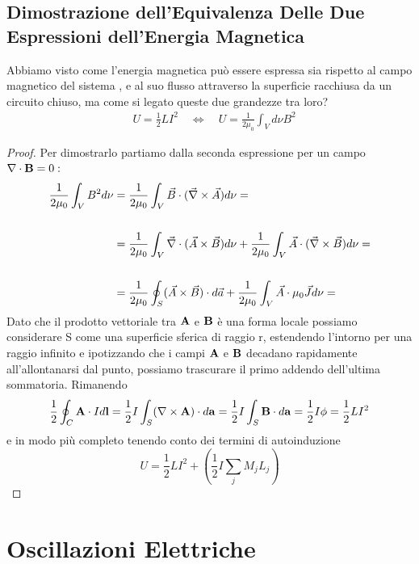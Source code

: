 \subsection{Dimostrazione dell'Equivalenza Delle Due Espressioni dell'Energia Magnetica}

Abbiamo visto come l'energia magnetica pu\`o essere espressa sia rispetto al campo magnetico del sistema , e al suo flusso attraverso la superficie racchiusa da un circuito chiuso, ma come si legato queste due grandezze tra loro? 
\begin{align*}
	& U = \frac{1}{2}L I^2 \quad \iff  \quad U = \frac{1}{2 \mu_0 } \int_{V} d \nu B^2 
\end{align*}

\begin{proof}
	Per dimostrarlo partiamo dalla seconda espressione per un campo $\nabla \cdot \bold{B} = 0:$
\begin{align*}
	\frac{1}{2 \mu_0} \int_V B^2 d \nu & =\frac{1}{2 \mu_0} \int_V \vec{B} \cdot(\vec{\nabla} \times \vec{A}) d \nu= \\ \rule{0pt}{30pt}
	& =\frac{1}{2 \mu_0} \int_V \vec{\nabla} \cdot(\vec{A} \times \vec{B}) d \nu+\frac{1}{2 \mu_0} \int_V \vec{A} \cdot (\vec{\nabla} \times \vec{B}) d \nu = \\ \rule{0pt}{30pt}
	& = \frac{1}{2 \mu_0} \oint_S(\vec{A} \times \vec{B}) \cdot d \vec{a}+\frac{1}{2 \mu_0} \int_V \vec{A} \cdot \mu_0 \vec{J} d \nu=
\end{align*}
Dato che il prodotto vettoriale tra $\bold{A}$ e $\bold{B}$ \`e una forma locale possiamo considerare S come una superficie sferica di raggio r, estendendo l'intorno per una raggio infinito e ipotizzando che i campi $\bold{A}$ e $\bold{B}$ decadano rapidamente all'allontanarsi dal punto, possiamo trascurare il primo addendo dell'ultima sommatoria. Rimanendo 
\begin{equation*}
	\frac{1}{2} \oint_{C} \bold{A} \cdot I d\bold{l} = \frac{1}{2}I \int_{S} (\nabla \times \bold{A})\cdot d\bold{a} = \frac{1}{2}I \int_{S} \bold{B} \cdot d\bold{a} = \frac{1}{2}I \phi = \frac{1}{2}L I^2
\end{equation*} 
e in modo pi\`u completo tenendo conto dei termini di autoinduzione 
\begin{equation*}
	U = \frac{1}{2}L I^2 + \left( \frac{1}{2}I \sum_j M_jL_j\right)
\end{equation*}
\end{proof}

\section{Oscillazioni Elettriche}

